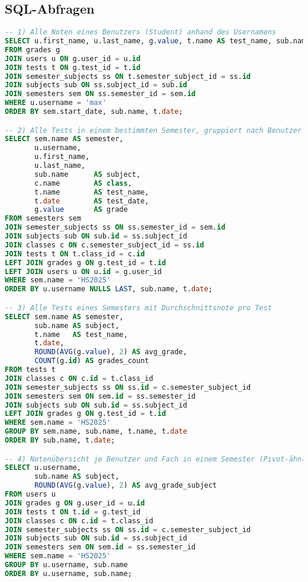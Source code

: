 \documentclass[12pt,a4paper]{article}
\begin{document}
    \subsection{SQL-Abfragen}
    \begin{lstlisting}[language=SQL]
-- 1) Alle Noten eines Benutzers (Student) anhand des Usernamens
SELECT u.first_name, u.last_name, g.value, t.name AS test_name, sub.name AS subject, sem.name AS semester
FROM grades g
JOIN users u ON g.user_id = u.id
JOIN tests t ON g.test_id = t.id
JOIN semester_subjects ss ON t.semester_subject_id = ss.id
JOIN subjects sub ON ss.subject_id = sub.id
JOIN semesters sem ON ss.semester_id = sem.id
WHERE u.username = 'max'
ORDER BY sem.start_date, sub.name, t.date;

-- 2) Alle Tests in einem bestimmten Semester, gruppiert nach Benutzer (nur Tests, Note optional)
SELECT sem.name AS semester,
       u.username,
       u.first_name,
       u.last_name,
       sub.name      AS subject,
       c.name        AS class,
       t.name        AS test_name,
       t.date        AS test_date,
       g.value       AS grade
FROM semesters sem
JOIN semester_subjects ss ON ss.semester_id = sem.id
JOIN subjects sub ON sub.id = ss.subject_id
JOIN classes c ON c.semester_subject_id = ss.id
JOIN tests t ON t.class_id = c.id
LEFT JOIN grades g ON g.test_id = t.id
LEFT JOIN users u ON u.id = g.user_id
WHERE sem.name = 'HS2025'
ORDER BY u.username NULLS LAST, sub.name, t.date;

-- 3) Alle Tests eines Semesters mit Durchschnittsnote pro Test
SELECT sem.name AS semester,
       sub.name AS subject,
       t.name   AS test_name,
       t.date,
       ROUND(AVG(g.value), 2) AS avg_grade,
       COUNT(g.id) AS grades_count
FROM tests t
JOIN classes c ON c.id = t.class_id
JOIN semester_subjects ss ON ss.id = c.semester_subject_id
JOIN semesters sem ON sem.id = ss.semester_id
JOIN subjects sub ON sub.id = ss.subject_id
LEFT JOIN grades g ON g.test_id = t.id
WHERE sem.name = 'HS2025'
GROUP BY sem.name, sub.name, t.name, t.date
ORDER BY sub.name, t.date;

-- 4) Notenübersicht je Benutzer und Fach in einem Semester (Pivot-ähnlich)
SELECT u.username,
       sub.name AS subject,
       ROUND(AVG(g.value), 2) AS avg_grade_subject
FROM users u
JOIN grades g ON g.user_id = u.id
JOIN tests t ON t.id = g.test_id
JOIN classes c ON c.id = t.class_id
JOIN semester_subjects ss ON ss.id = c.semester_subject_id
JOIN subjects sub ON sub.id = ss.subject_id
JOIN semesters sem ON sem.id = ss.semester_id
WHERE sem.name = 'HS2025'
GROUP BY u.username, sub.name
ORDER BY u.username, sub.name;


\end{lstlisting}
\end{document}

